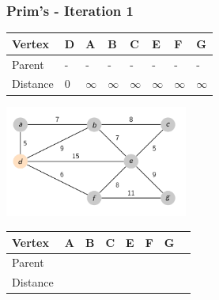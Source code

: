 \documentclass{beamer}
\begin{document}
\begin{frame}[fragile]
    \frametitle{Prim's - Iteration 1}
    \centering
    \begin{table}[]
        \begin{tabular}{|l|l|l|l|l|l|l|l|}
            \hline
            Vertex   & D        & A        & B        & C        & E        & F        & G        \\ \hline
            Parent   & -        & -        & -        & -        & -        & -        & -        \\ \hline
            Distance & 0 & $\infty$ & $\infty$ & $\infty$ & $\infty$ & $\infty$ & $\infty$ \\ \hline
        \end{tabular}
    \end{table}
    \includegraphics[width=0.45\textwidth]{./imgs/prims_walkthrough/prims1.png}
    \vspace{-0.2cm}
    \begin{table}[]
        \begin{tabular}{|l|l|l|l|l|l|l|l|}
            \hline
            Vertex   &  A        & B        & C        & E        & F        & G        \\ \hline
            Parent   &           &          &          &          &          &          \\ \hline
            Distance &  $      $ & $      $ & $      $ & $      $ & $      $ & $      $ \\ \hline
        \end{tabular}
    \end{table}
\end{frame}
\end{document}
